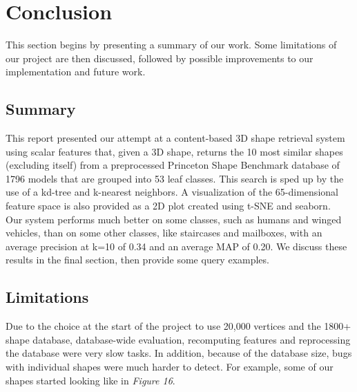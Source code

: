 \documentclass{bigdata}
\begin{document}
\section{Conclusion}
This section begins by presenting a summary of our work. Some limitations of our project are then discussed, followed by possible improvements to our implementation and future work.
\subsection{Summary}
This report presented our attempt at a content-based 3D shape retrieval system using scalar features that, given a 3D shape, returns the 10 most similar shapes (excluding itself) from a preprocessed Princeton Shape Benchmark database of 1796 models that are grouped into 53 leaf classes. This search is sped up by the use of a kd-tree and k-nearest neighbors. A visualization of the 65-dimensional feature space is also provided as a 2D plot created using t-SNE and seaborn. \\
Our system performs much better on some classes, such as humans and winged vehicles, than on some other classes, like staircases and mailboxes, with an average precision at k=10 of 0.34 and an average MAP of 0.20. We discuss these results in the final section, then provide some query examples.

\subsection{Limitations}

Due to the choice at the start of the project to use 20,000 vertices and the 1800+ shape database, database-wide evaluation, recomputing features and reprocessing the database were very slow tasks. In addition, because of the database size, bugs with individual shapes were much harder to detect. For example, some of our shapes started looking like in \textit{Figure 16}.
\end{document}
